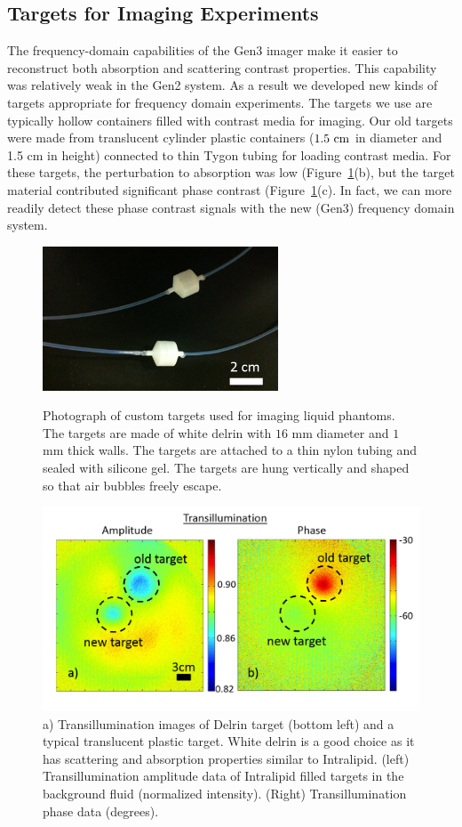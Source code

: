 \subsection{Targets for Imaging Experiments}
The frequency-domain capabilities of the Gen3 imager make it easier to reconstruct both absorption and scattering contrast properties. This capability was relatively weak in the Gen2 system. As a result we developed new kinds of targets appropriate for frequency domain experiments. The targets we use are typically hollow containers filled with contrast media for imaging. Our old targets were made from translucent cylinder plastic containers ($1.5~\rm{cm}$ in diameter and 1.5 cm in height) connected to thin Tygon tubing for loading contrast media. For these targets, the perturbation to absorption was low (Figure~\ref{fig:targettrans}(b), but the target material contributed significant phase contrast (Figure~\ref{fig:targettrans}(c). In fact, we can more readily detect these phase contrast signals with the new (Gen3) frequency domain system.
%
\begin{figure}
\centering
\includegraphics[width=7cm]{./figures/4_Gen3/targetpic.png}
\caption[Photograph of custom targets used for imaging liquid phantoms.]{Photograph of custom targets used for imaging liquid phantoms. The targets are made of white delrin with $16$ mm diameter and $1$ mm thick walls. The targets are attached to a thin nylon tubing and sealed with silicone gel. The targets are hung vertically and shaped so that air bubbles freely escape.}
\label{fig:targetpic}
\includegraphics[width=14.5cm]{./figures/4_Gen3/targettrans.png}
\caption[Transillumination images of Delrin target]{a) Transillumination images of Delrin target (bottom left) and a typical translucent plastic target. White delrin is a good choice as it has scattering and absorption properties similar to Intralipid. (left) Transillumination amplitude data of Intralipid filled targets in the background fluid (normalized intensity). (Right) Transillumination phase data (degrees).}
\label{fig:targettrans}
\end{figure}
